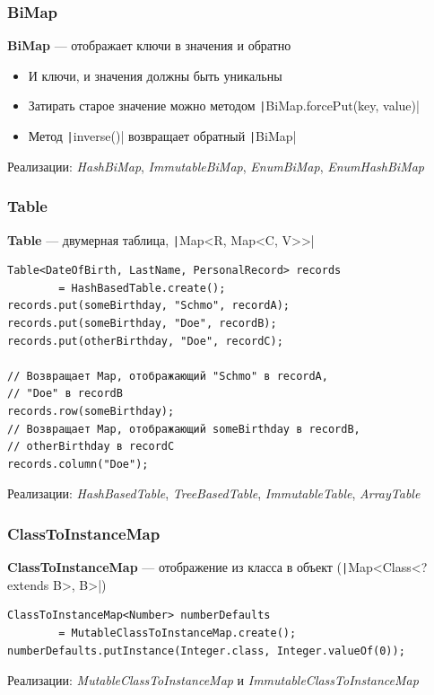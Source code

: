 \documentclass[xetex,mathserif,serif]{beamer}
\begin{document}
	\begin{frame}
		\frametitle{BiMap}
		\textbf{BiMap} --- отображает ключи в значения и обратно
		\begin{itemize}
			\item И ключи, и значения должны быть уникальны
			\item Затирать старое значение можно методом \texttt|BiMap.forcePut(key, value)|
			\item Метод \texttt|inverse()| возвращает обратный \texttt|BiMap|
		\end{itemize}

		Реализации: \textit{HashBiMap}, \textit{ImmutableBiMap}, \textit{EnumBiMap}, \textit{EnumHashBiMap}
	\end{frame}

	\begin{frame}[fragile]
		\frametitle{Table}
		\textbf{Table} --- двумерная таблица, \texttt|Map<R, Map<C, V>>|
		
		\begin{verbatim}
Table<DateOfBirth, LastName, PersonalRecord> records 
        = HashBasedTable.create();
records.put(someBirthday, "Schmo", recordA);
records.put(someBirthday, "Doe", recordB);
records.put(otherBirthday, "Doe", recordC);

// Возвращает Map, отображающий "Schmo" в recordA, 
// "Doe" в recordB
records.row(someBirthday); 
// Возвращает Map, отображающий someBirthday в recordB, 
// otherBirthday в recordC
records.column("Doe"); 
		\end{verbatim}
		
		Реализации: \textit{HashBasedTable}, \textit{TreeBasedTable}, \textit{ImmutableTable}, \textit{ArrayTable}
\end{frame}

	\begin{frame}[fragile]
		\frametitle{ClassToInstanceMap}
		\textbf{ClassToInstanceMap} --- отображение из класса в объект (\texttt|Map<Class<? extends B>, B>|)

		\begin{verbatim}
ClassToInstanceMap<Number> numberDefaults 
        = MutableClassToInstanceMap.create();
numberDefaults.putInstance(Integer.class, Integer.valueOf(0));
		\end{verbatim}

		Реализации: \textit{MutableClassToInstanceMap} и \textit{ImmutableClassToInstanceMap}
\end{frame}
\end{document}
